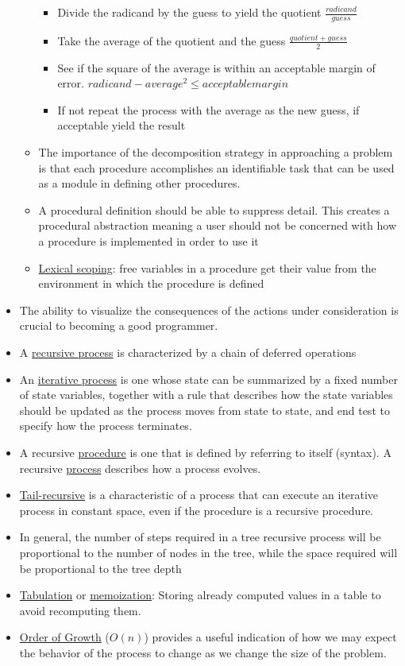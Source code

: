 \documentclass{article}
\begin{document}
\begin{itemize}
\begin{itemize}
{{\begin{itemize}
          \begin{itemize}
          \item Divide the radicand by the guess to yield the quotient $\frac{radicand}{guess}$
          \item Take the average of the quotient and the guess $\frac{quotient + guess}{2}$
          \item See if the square of the average is within an acceptable margin of error. $radicand - average^2 \leq acceptable margin$
          \item If not repeat the process with the average as the new guess, if acceptable yield the result
          \end{itemize}
        \end{itemize}
      }%
      }
  \item The importance of the decomposition strategy in approaching a problem is that each procedure accomplishes an identifiable task that can be used as a module in defining other procedures.
  \item A procedural definition should be able to suppress detail. This creates a procedural abstraction meaning a user should not be concerned with how a procedure is implemented in order to use it
  \item \underline{Lexical scoping}: free variables in a procedure get their value from the environment in which the procedure is defined
  \end{itemize}
\item The ability to visualize the consequences of the actions under consideration is crucial to becoming a good programmer.
\item A \underline{recursive process} is characterized by a chain of deferred operations
\item An \underline{iterative process} is one whose state can be summarized by a fixed number of state variables, together with a rule that describes how the state variables should be updated as the process moves from state to state, and end test to specify how the process terminates.
\item A recursive \underline{procedure} is one that is defined by referring to itself (syntax). A recursive \underline{process} describes how a process evolves.
\item \underline{Tail-recursive} is a characteristic of a process that can execute an iterative process in constant space, even if the procedure is a recursive procedure.
\item In general, the number of steps required in a tree recursive process will be proportional to the number of nodes in the tree, while the space required will be proportional to the tree depth
\item \underline{Tabulation} or \underline{memoization}: Storing already computed values in a table to avoid recomputing them.
\item \underline{Order of Growth} ($O(n)$) provides a useful indication of how we may expect the behavior of the process to change as we change the size of the problem.


\end{itemize}
\end{document}
